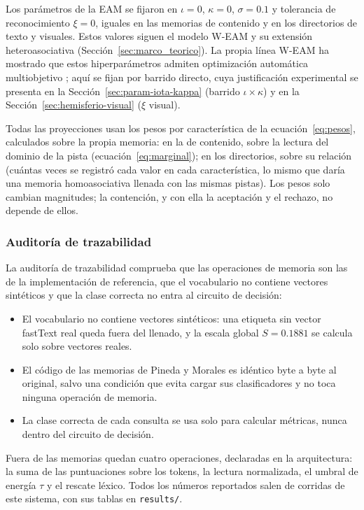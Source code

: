 Los parámetros de la EAM se fijaron en $\iota = 0$, $\kappa = 0$, $\sigma = 0.1$ y
tolerancia de reconocimiento $\xi = 0$, iguales en las memorias de contenido y en los
directorios de texto y visuales.
Estos valores siguen el modelo W-EAM y su extensión heteroasociativa
(Sección~\ref{sec:marco_teorico}).
La propia línea W-EAM ha mostrado que estos hiperparámetros admiten optimización
automática multiobjetivo \cite{lopez2025hyperopt}; aquí se fijan por barrido directo,
cuya justificación experimental se presenta en la Sección~\ref{sec:param-iota-kappa}
(barrido $\iota \times \kappa$) y en la Sección~\ref{sec:hemisferio-visual}
($\xi$ visual).

Todas las proyecciones usan los pesos por característica de la ecuación~\eqref{eq:pesos},
calculados sobre la propia memoria: en la de contenido, sobre la lectura del dominio de
la pista (ecuación~\eqref{eq:marginal}); en los directorios, sobre su relación (cuántas
veces se registró cada valor en cada característica, lo mismo que daría una memoria
homoasociativa llenada con las mismas pistas).
Los pesos solo cambian magnitudes; la contención, y con ella la aceptación y el rechazo,
no depende de ellos.

\subsubsection{Auditoría de trazabilidad}
\label{sec:auditoria}

La auditoría de trazabilidad comprueba que las operaciones de memoria son las de la
implementación de referencia, que el vocabulario no contiene vectores sintéticos y que
la clase correcta no entra al circuito de decisión:
\begin{itemize}
    \item El vocabulario no contiene vectores sintéticos: una etiqueta sin vector fastText
    real queda fuera del llenado, y la escala global $S = 0.1881$ se calcula solo sobre
    vectores reales.
    \item El código de las memorias de Pineda y Morales es idéntico byte a byte al
    original, salvo una condición que evita cargar sus clasificadores y no toca ninguna
    operación de memoria.
    \item La clase correcta de cada consulta se usa solo para calcular métricas, nunca
    dentro del circuito de decisión.
\end{itemize}
Fuera de las memorias quedan cuatro operaciones, declaradas en la arquitectura: la suma
de las puntuaciones sobre los tokens, la lectura normalizada, el umbral de energía $\tau$
y el rescate léxico.
Todos los números reportados salen de corridas de este sistema, con sus tablas en
\texttt{results/}.

